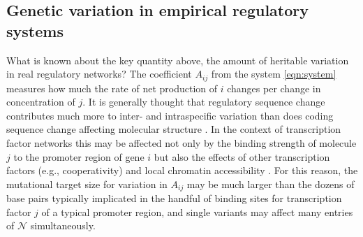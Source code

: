 \documentclass{article}
\newcommand{\1}{\mathbbm{1}}
\newcommand{\allS}{\mathcal{N}}
\begin{document}
\subsection*{Genetic variation in empirical regulatory systems}

What is known about the key quantity above, the amount of heritable variation in real regulatory networks?
The coefficient $A_{ij}$ from the system \eqref{eqn:system} measures how much the rate of net production of $i$ changes
per change in concentration of $j$.
It is generally thought that regulatory sequence change contributes much more to inter- and intraspecific variation
than does coding sequence change affecting molecular structure \citep{schmidt2010fivevertebrate}.
In the context of transcription factor networks this may be affected 
not only by the binding strength of molecule $j$ to the promoter region of gene $i$
but also the effects of other transcription factors (e.g., cooperativity)
and local chromatin accessibility \citep{stefflova2013cooperativity}.
For this reason, 
the mutational target size for variation in $A_{ij}$ may be much larger than the dozens of base pairs
typically implicated in the handful of binding sites for transcription factor $j$ of a typical promoter region,
and single variants may affect many entries of $\allS$ simultaneously.
\end{document}
